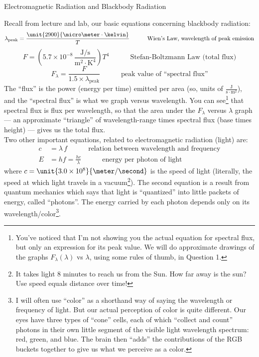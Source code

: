 \documentclass[12pt]{article}
\begin{document}
\begin{center}
{\Large Electromagnetic Radiation and Blackbody Radiation}
\end{center}

\noindent Recall from lecture and lab, our basic equations concerning blackbody radiation:
	\begin{equation*}
	\lambda_\text{peak} = \frac{\unit{2900}{\micro\meter \cdot \kelvin}}{T} \quad \quad \quad \text{Wien's Law, wavelength of peak emission}
	\end{equation*}
	\begin{equation*}
	F = \left( 5.7 \times 10^{-8} \, \frac{\text{J}/\text{s}}{\text{m}^2 \cdot \text{K}^4}\right) T^4 \quad \quad \quad \text{Stefan-Boltzmann Law (total flux)}
	\end{equation*}
	\begin{equation*}
	F_\lambda = \frac{F}{1.5 \times \lambda_\text{peak}} \quad \quad \quad \text{peak value of ``spectral flux''}
	\end{equation*}
The ``flux'' is the power (energy per time) emitted per area (so, units of $\frac{\text{J}}{\text{s} \cdot \text{m}^2}$), and the ``spectral flux'' is what we graph versus wavelength. You can see\footnote{You've noticed that I'm not showing you the actual equation for spectral flux, but only an expression for its peak value.  We will do approximate drawings of the graphs $F_\lambda(\lambda)$ vs $\lambda$, using some rules of thumb, in Question 1.} that spectral flux is flux per wavelength, so that the area under the $F_\lambda$ versus $\lambda$ graph --- an approximate ``triangle'' of wavelength-range times spectral flux (base times height) --- gives us the total flux.\\[-6pt]

\noindent Two other important equations, related to electromagnetic radiation (light) are:
	\begin{equation*} 
	\begin{split}
	c &= \lambda \, f \quad \quad \quad  \text{relation between wavelength and frequency} \\
	E &= h f = \frac{h c}{\lambda} \quad \quad \quad \text{energy per photon of light}
	\end{split}
	\end{equation*}
where $c = \unit{3.0\times 10^{8}}{\meter/\second}$ is the speed of light (literally, the speed at which light travels in a vacuum\footnote{It takes light 8 minutes to reach us from the Sun.  How far away is the sun?  Use speed equals distance over time!}). The second equation is a result from quantum mechanics which says that light is ``quantized'' into little packets of energy, called ``photons''.  The energy carried by each photon depends only on its wavelength/color\footnote{I will often use ``color'' as a shorthand way of saying the wavelength or frequency of light. But our actual perception of color is quite different.  Our eyes have three types of ``cone'' cells, each of which ``collect and count'' photons in their own little segment of the visible light wavelength spectrum: red, green, and blue.  The brain then ``adds'' the contributions of the RGB buckets together to give us what we perceive as a color.}.
\end{document}
